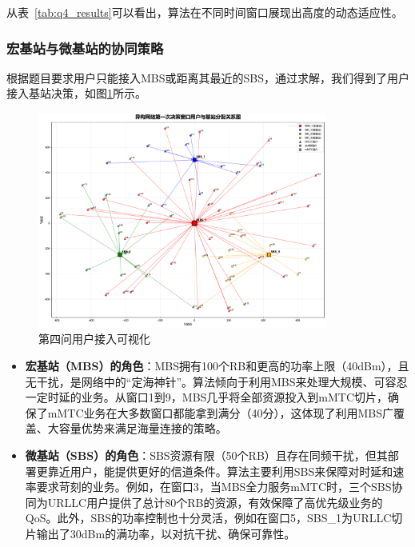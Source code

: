 从表~\ref{tab:q4_results}可以看出，算法在不同时间窗口展现出高度的动态适应性。
\subsubsection{宏基站与微基站的协同策略}
根据题目要求用户只能接入MBS或距离其最近的SBS，通过求解，我们得到了用户接入基站决策，如图\ref{fig:q4_user_bs_mapping}所示。
\begin{figure}[H]
    \centering
    \includegraphics[width=0.85\textwidth]{figures/第四问结果可视化.pdf}
    \caption{第四问用户接入可视化}
    \label{fig:q4_user_bs_mapping}
\end{figure}

\begin{itemize}
    \item \textbf{宏基站（MBS）的角色}：MBS拥有100个RB和更高的功率上限（40dBm），且无干扰，是网络中的“定海神针”。算法倾向于利用MBS来处理大规模、可容忍一定时延的业务。从窗口1到9，MBS几乎将全部资源投入到mMTC切片，确保了mMTC业务在大多数窗口都能拿到满分（40分），这体现了利用MBS广覆盖、大容量优势来满足海量连接的策略。
    \item \textbf{微基站（SBS）的角色}：SBS资源有限（50个RB）且存在同频干扰，但其部署更靠近用户，能提供更好的信道条件。算法主要利用SBS来保障对时延和速率要求苛刻的业务。例如，在窗口3，当MBS全力服务mMTC时，三个SBS协同为URLLC用户提供了总计80个RB的资源，有效保障了高优先级业务的QoS。此外，SBS的功率控制也十分灵活，例如在窗口5，SBS\_1为URLLC切片输出了30dBm的满功率，以对抗干扰、确保可靠性。
\end{itemize}
